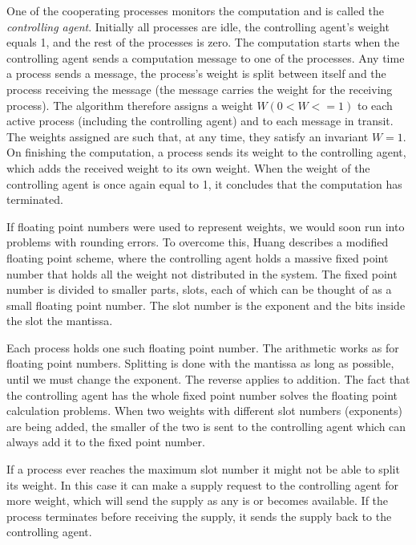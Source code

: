 \documentclass[11pt]{article}
\newcommand{\bu}[1]{\textsf{#1}}
\begin{document}
One of the cooperating processes monitors the computation
and is called the \emph{controlling agent}.
Initially all processes are
idle, the controlling agent's weight equals 1, and the rest of the processes
is zero. The computation starts when the controlling agent sends a computation
message to one of the processes. Any time a process sends a message, the
process's weight is split between itself and the process receiving the
message (the message carries the weight for the receiving process). The
algorithm therefore assigns a weight $W (0 < W <= 1)$ to each active
process (including the controlling agent) and to each message in transit.
The weights assigned are such that, at any time, they satisfy an invariant
$W = 1$. On finishing the computation,
a process sends its weight to the controlling agent, which adds the received
weight to its own weight. When the weight of the controlling agent is once
again equal to 1, it concludes that the computation has terminated.

If floating point numbers were used to represent weights, we would soon run
into problems with rounding errors. To overcome this, Huang describes a
modified floating point scheme, where the controlling agent holds a massive
fixed point number that holds all the weight not distributed in the system.
The fixed point number is divided to smaller parts, slots, each of which can be
thought of as a small floating point number. The slot number is the exponent
and the bits inside the slot the mantissa.

Each process holds one such floating point number. The arithmetic works as
for floating point numbers. Splitting is done with the mantissa as long as possible,
until we must change the exponent. The reverse applies to addition.
The fact that the controlling agent has the whole
fixed point number solves the floating point calculation problems. When two
weights with different slot numbers (exponents) are being added, the smaller
of the two is sent to the controlling agent which can always add it to the
fixed point number.

If a process ever reaches the maximum slot number it might not be able to split
its weight. In this case it can make a supply request to the controlling agent
for more weight, which will send the supply as any is or becomes available.
If the process terminates before receiving the supply, it sends the supply
back to the controlling agent.

\end{document}
